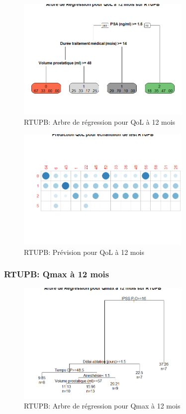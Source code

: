 \begin{figure}[H]
\centering
\includegraphics[width=0.75\textwidth]{../Fig/RTUPB/rtupb-regtree-qol12.png}
\caption{RTUPB: Arbre de régression pour QoL à 12 mois}
\label{fig-rtupb-regtree-qol12}
\end{figure}

\begin{figure}[H]
\centering
\includegraphics[width=0.75\textwidth]{../Fig/RTUPB/rtupb-regtree-predict-qol12.png}
\caption{RTUPB: Prévision pour QoL à 12 mois}
\label{fig-rtupb-regtree-predict-qol12}
\end{figure}


\subsubsection{RTUPB: Qmax à 12 mois}

\begin{figure}[H]
\centering
\includegraphics[width=0.75\textwidth]{../Fig/RTUPB/rtupb-regtree-qmax12.png}
\caption{RTUPB: Arbre de régression pour Qmax à 12 mois}
\label{fig-rtupb-regtree-qmax12}
\end{figure}

